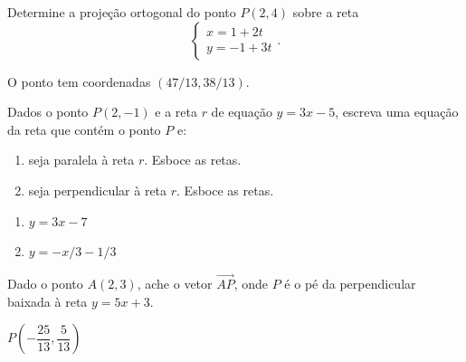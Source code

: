 \documentclass[12pt]{exam}
\begin{document}
\questao{} Determine a projeção ortogonal do ponto $P(2,4)$ sobre a reta
\[
    \begin{cases}
        x = 1 + 2t \\
        y = -1 + 3t
    \end{cases}.
\]
\begin{solucao}
    O ponto tem coordenadas $(47/13, 38/13)$.
\end{solucao}

\vspace{.3cm}

\questao{} Dados o ponto $P(2, -1)$ e a reta $r$ de equação $y = 3x - 5$, escreva uma equação da reta que contém o ponto $P$ e:
\begin{enumerate}[label=({\alph*})]
    \item seja paralela à reta $r$. Esboce as retas.
    \item seja perpendicular à reta $r$. Esboce as retas.
\end{enumerate}
\begin{solucao}
    \begin{enumerate}[label=({\alph*})]
        \item $y = 3x - 7$
        \item $y = -x/3 - 1/3$
    \end{enumerate}
\end{solucao}

\newpage

\questao{} Dado o ponto $A(2,3)$, ache o vetor $\vec{AP}$, onde $P$ é o pé da perpendicular baixada à reta $y = 5x + 3$.
\begin{solucao}
    $P\left(-\dfrac{25}{13},\dfrac{5}{13}\right)$
\end{solucao}

\vspace{.3cm}
\end{document}
